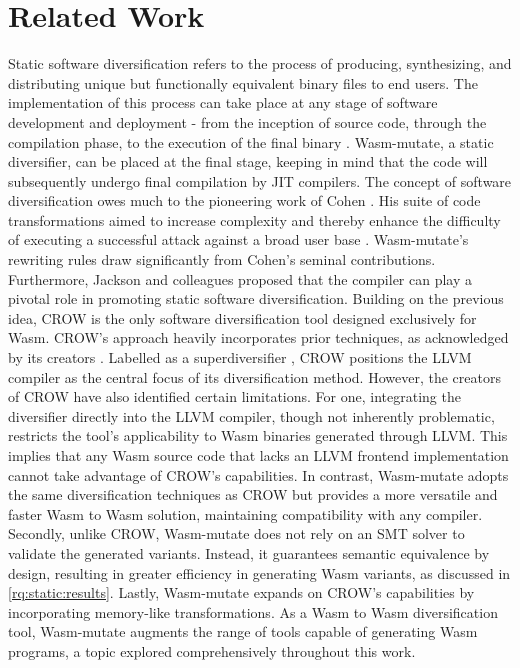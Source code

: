 \documentclass[sigplan,screen]{acmart}
\newcommand{\tool}{Wasm-mutate\xspace}
\newcommand{\wasm}{Wasm\xspace}
\begin{document}
\section{Related Work}
\label{rw}
Static software diversification refers to the process of producing, synthesizing, and distributing unique but functionally equivalent binary files to end users. 
The implementation of this process can take place at any stage of software development and deployment - from the inception of source code, through the compilation phase, to the execution of the final binary \cite{jackson2011compiler, lundquist2016searching}.
\tool, a static diversifier, can be placed at the final stage, keeping in mind that the code will subsequently undergo final compilation by JIT compilers.
The concept of software diversification owes much to the pioneering work of Cohen \cite{cohen1993operating}. 
His suite of code transformations aimed to increase complexity and thereby enhance the difficulty of executing a successful attack against a broad user base \cite{cohen1993operating}. 
\tool's rewriting rules draw significantly from Cohen's seminal contributions.
Furthermore, Jackson and colleagues \cite{jackson2011compiler} proposed that the compiler can play a pivotal role in promoting static software diversification. 
Building on the previous idea, CROW is the only software diversification tool designed exclusively for \wasm. 
CROW's approach heavily incorporates prior techniques, as acknowledged by its creators \cite{arteaga2020crow}. 
Labelled as a superdiversifier \cite{jacob2008superdiversifier}, CROW positions the LLVM compiler as the central focus of its diversification method. 
However, the creators of CROW have also identified certain limitations.
For one, integrating the diversifier directly into the LLVM compiler, though not inherently problematic, restricts the tool's applicability to \wasm binaries generated through LLVM. 
This implies that any \wasm source code that lacks an LLVM frontend implementation cannot take advantage of CROW's capabilities.
In contrast, \tool adopts the same diversification techniques as CROW but provides a more versatile and faster \wasm to \wasm solution, maintaining compatibility with any compiler. 
Secondly, unlike CROW, \tool does not rely on an SMT solver to validate the generated variants. 
Instead, it guarantees semantic equivalence by design, resulting in greater efficiency in generating \wasm variants, as discussed in \autoref{rq:static:results}.
Lastly, \tool expands on CROW's capabilities by incorporating memory-like transformations. 
As a \wasm to \wasm diversification tool, \tool augments the range of tools capable of generating \wasm programs, a topic explored comprehensively throughout this work.
\end{document}
